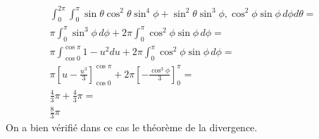 \begin{myExample}
\begin{enumerate}
\begin{eqnarray*}
			\\
			\int_0^{2\pi}\int_0^\pi \sin\theta\cos^2\theta\sin^4\phi+\sin^2\theta\sin^3\phi,\cos^2\phi\sin\phi\,d\phi d\theta=
			\\
			\pi\int_0^\pi\sin^3\phi\,d\phi+2\pi\int_0^\pi\cos^2\phi\sin\phi\,d\phi=
			\\
			\pi\int_{\cos0}^{\cos\pi}1-u^2du+2\pi\int_0^\pi\cos^2\phi\sin\phi\,d\phi=
			\\
			\pi\left[u-\frac{u^3}{3}\right]_{\cos0}^{\cos\pi}+2\pi\left[-\frac{\cos^3\phi}{3}\right]_{0}^{\pi}=
			\\\frac{4}{3}\pi+\frac{4}{3}\pi=
			\\\frac{8}{3}\pi
		\end{eqnarray*}
		On a bien vérifié dans ce cas le théorème de la divergence.
	\end{enumerate}
\end{myExample}

